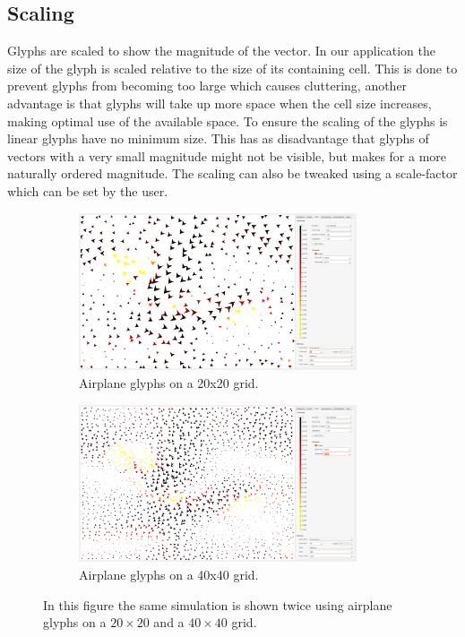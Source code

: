 \subsection{Scaling} %
\label{sub:scaling}
Glyphs are scaled to show the magnitude of the vector. In our application the size of the glyph is scaled relative to the size of its containing cell. This is done to prevent glyphs from becoming too large which causes cluttering, another advantage is that glyphs will take up more space when the cell size increases, making optimal use of the available space. To ensure the scaling of the glyphs is linear glyphs have no minimum size. This has as disadvantage that glyphs of vectors with a very small magnitude might not be visible, but makes for a more naturally ordered magnitude. The scaling can also be tweaked using a scale-factor which can be set by the user.
\begin{figure}[tbh]
	\centering
	\begin{subfigure}{0.45\textwidth}
		\centering
		\includegraphics[width=0.9\textwidth, trim={35px 30px 430px 30px}, clip]{img/glyphs/scaling_20}
		\caption{Airplane glyphs on a 20x20 grid.}
		\label{fig:scaling:20}
	\end{subfigure}
	\hspace{30px}
	\begin{subfigure}{0.45\textwidth}	
		\centering
		\includegraphics[width=0.9\textwidth, trim={35px 30px 430px 30px}, clip]{img/glyphs/scaling_40}
		\caption{Airplane glyphs on a 40x40 grid.}
		\label{fig:scaling:40}
	\end{subfigure}
	\caption{In this figure the same simulation is shown twice using airplane glyphs on  a $20 \times 20$ and  a $40 \times 40$ grid.}
	\label{fig:scaling}
\end{figure}

